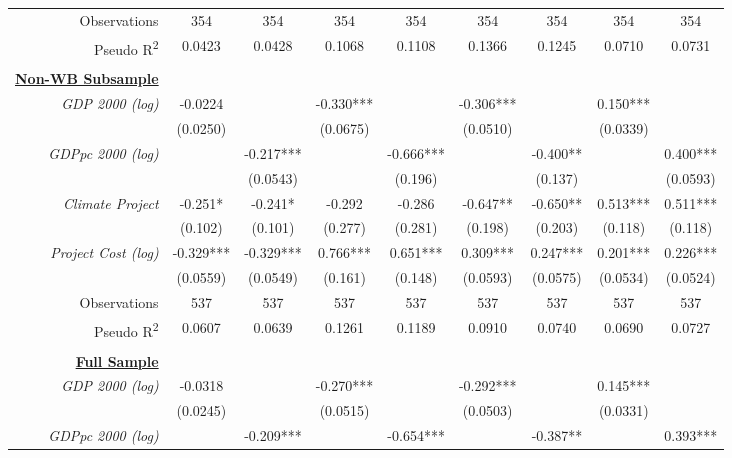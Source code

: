 \documentclass{article}
\begin{document}
\begin{singlespace}
\begin{table}[H]
{\begin{tabular}{rcccccccc}
			Observations & 354 & 354 & 354 & 354 & 354 & 354 & 354 & 354 \\
			Pseudo R\textsuperscript{2} & 0.0423 & 0.0428 & 0.1068 & 0.1108 & 0.1366 & 0.1245 & 0.0710 & 0.0731 \\ \hline
			\multicolumn{1}{l}{\textit{}} & \multicolumn{1}{l}{} & \multicolumn{1}{l}{} & \multicolumn{1}{l}{} & \multicolumn{1}{l}{} & \multicolumn{1}{l}{} & \multicolumn{1}{l}{} & \multicolumn{1}{l}{} & \multicolumn{1}{l}{} \\
			{\ul \textbf{Non-WB Subsample}} &  &  &  &  &  &  &  &  \\
			\textit{GDP 2000 (log)} & -0.0224 &  & -0.330*** &  & -0.306*** &  & 0.150*** &  \\
			\textit{} & (0.0250) &  & (0.0675) &  & (0.0510) &  & (0.0339) &  \\
			\textit{GDPpc 2000 (log)} &  & -0.217*** &  & -0.666*** &  & -0.400** &  & 0.400*** \\
			\textit{} &  & (0.0543) &  & (0.196) &  & (0.137) &  & (0.0593) \\
			\textit{Climate Project} & -0.251* & -0.241* & -0.292 & -0.286 & -0.647** & -0.650** & 0.513*** & 0.511*** \\
			\textit{} & (0.102) & (0.101) & (0.277) & (0.281) & (0.198) & (0.203) & (0.118) & (0.118) \\
			\textit{Project Cost (log)} & -0.329*** & -0.329*** & 0.766*** & 0.651*** & 0.309*** & 0.247*** & 0.201*** & 0.226*** \\
			\textit{} & (0.0559) & (0.0549) & (0.161) & (0.148) & (0.0593) & (0.0575) & (0.0534) & (0.0524) \\ \hline
			Observations & 537 & 537 & 537 & 537 & 537 & 537 & 537 & 537 \\
			Pseudo R\textsuperscript{2} & 0.0607 & 0.0639 & 0.1261 & 0.1189 & 0.0910 & 0.0740 & 0.0690 & 0.0727 \\ \hline
			\multicolumn{1}{l}{\textit{}} & \multicolumn{1}{l}{} & \multicolumn{1}{l}{} & \multicolumn{1}{l}{} & \multicolumn{1}{l}{} & \multicolumn{1}{l}{} & \multicolumn{1}{l}{} & \multicolumn{1}{l}{} & \multicolumn{1}{l}{} \\
			{\ul \textbf{Full Sample}} &  &  &  &  &  &  &  &  \\
			\textit{GDP 2000 (log)} & -0.0318 &  & -0.270*** &  & -0.292*** &  & 0.145*** &  \\
			\textit{} & (0.0245) &  & (0.0515) &  & (0.0503) &  & (0.0331) &  \\
			\textit{GDPpc 2000 (log)} &  & -0.209*** &  & -0.654*** &  & -0.387** &  & 0.393*** \\

\end{tabular}}
\end{table}
\end{singlespace}
\end{document}

